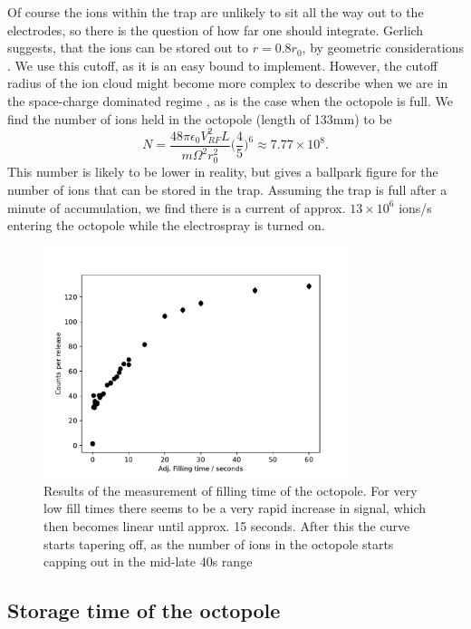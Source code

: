 Of course the ions within the trap are unlikely to sit all the way out to the electrodes, so there is the question of how far one should integrate. Gerlich suggests, that the ions can be stored out to $r = 0.8r_0$, by geometric considerations \cite{Gerlich1992}. We use this cutoff, as it is an easy bound to implement. However, the cutoff radius of the ion cloud might become more complex to describe when we are in the 
space-charge dominated regime \cite{MajimaDensity}, as is the case when the octopole is full. We find the number of ions held in the octopole (length of 133mm) to be
\begin{equation}
    N = \frac{48\pi\epsilon_0V_{RF}^2L}{m\Omega^2r_0^2}\bigg(\frac{4}{5}\bigg)^6\approx 7.77\times 10^8.
\end{equation}
This number is likely to be lower in reality, but gives a ballpark figure for the number of ions that can be stored in the trap. Assuming the trap is full after a minute of accumulation, we find there is a current of approx. $13\times 10^6$ ions/s entering the octopole while the electrospray is turned on.


\begin{figure}
    \centering
    \includegraphics[width = 0.8\textwidth]{main/FillingTimeGraph.pdf}
    \caption{Results of the measurement of filling time of the octopole. For very low fill times there seems to be a very rapid increase in signal, which then becomes linear until approx. 15 seconds. After this the curve starts tapering off, as the number of ions in the octopole starts capping out in the mid-late 40s range}
    \label{fig:fillTimeGraph}
\end{figure}
\subsection{Storage time of the octopole}


